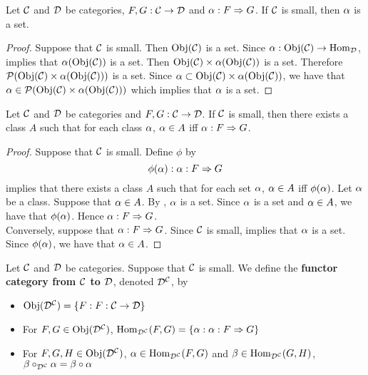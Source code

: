 \documentclass{book}
\begin{document}
	\begin{ex} 
		Let $\mathcal{C}$ and $\mathcal{D}$ be categories, $F,G: \mathcal{C} \rightarrow \mathcal{D}$ and $\alpha: F \Rightarrow G$. If $\mathcal{C}$ is small, then $\alpha$ is a set.
	\end{ex}

	\begin{proof}
		Suppose that $\mathcal{C}$ is small. Then $\operatorname{Obj}(\mathcal{C})$ is a set. Since $\alpha: \operatorname{Obj}(\mathcal{C}) \rightarrow \operatorname{Hom}_{\mathcal{D}}$,  implies that $\alpha(\operatorname{Obj}(\mathcal{C}))$ is a set. Then $ \operatorname{Obj}(\mathcal{C}) \times \alpha(\operatorname{Obj}(\mathcal{C}))$ is a set. Therefore $\mathcal{P}(\operatorname{Obj}(\mathcal{C}) \times \alpha(\operatorname{Obj}(\mathcal{C})))$ is a set. Since $\alpha \subset \operatorname{Obj}(\mathcal{C}) \times \alpha(\operatorname{Obj}(\mathcal{C}))$, we have that $\alpha \in \mathcal{P}(\operatorname{Obj}(\mathcal{C}) \times \alpha(\operatorname{Obj}(\mathcal{C})))$ which implies that $\alpha$ is a set. 
	\end{proof}

	\begin{ex} 
			Let $\mathcal{C}$ and $\mathcal{D}$ be categories and $F,G: \mathcal{C} \rightarrow \mathcal{D}$. If $\mathcal{C}$ is small, then there exists a class $A$ such that for each class $\alpha$, $\alpha \in A$ iff $\alpha: F \Rightarrow G$. 
	\end{ex}

	\begin{proof}
		Suppose that $\mathcal{C}$ is small. Define $\phi$ by 
		$$\phi(\alpha): \alpha: F \Rightarrow G$$
		 implies that there exists a class $A$ such that for each set $\alpha$, $\alpha \in A$ iff $\phi(\alpha)$. 
		Let $\alpha$ be a class. Suppose that $\alpha \in A$. By , $\alpha$ is a set. Since $\alpha$ is a set and $\alpha \in A$, we have that $\phi(\alpha)$. Hence $\alpha:F \Rightarrow G$. \\
		Conversely, suppose that $\alpha: F \Rightarrow G$.  Since $\mathcal{C}$ is small,  implies that $\alpha$ is a set. Since $\phi(\alpha)$, we have that $\alpha \in A$. 
	\end{proof}
	
	\begin{defn} 
		Let $\mathcal{C}$ and $\mathcal{D}$ be categories. Suppose that $\mathcal{C}$ is small. We define the \textbf{functor category from $\mathcal{C}$ to $\mathcal{D}$}, denoted $\mathcal{D}^{\mathcal{C}}$, by 
		\begin{itemize}
			\item $\operatorname{Obj}(\mathcal{D}^{\mathcal{C}}) = \{F: F: \mathcal{C} \rightarrow \mathcal{D}\}$
			\item For $F, G \in \operatorname{Obj}(\mathcal{D}^{\mathcal{C}})$, $\operatorname{Hom}_{\mathcal{D}^{\mathcal{C}}}(F, G) = \{\alpha: \alpha: F \Rightarrow G \}$
			\item For $F, G, H \in \operatorname{Obj}(\mathcal{D}^{\mathcal{C}})$, $\alpha \in \operatorname{Hom}_{\mathcal{D}^{\mathcal{C}}}(F, G)$ and $\beta \in \operatorname{Hom}_{\mathcal{D}^{\mathcal{C}}}(G, H)$, 
			$\beta \circ_{\mathcal{D}^{\mathcal{C}}} \alpha = \beta \circ \alpha $
		\end{itemize} 
	\end{defn}
\end{document}
